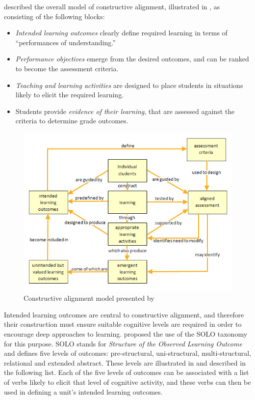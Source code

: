 \citet{Houghton:2004} described the overall model of constructive alignment, illustrated in , as consisting of the following blocks:
\begin{itemize}[noitemsep,nolistsep]
	\item \emph{Intended learning outcomes} clearly define required learning in terms of ``performances of understanding.''
	\item \emph{Performance objectives} emerge from the desired outcomes, and can be ranked to become the assessment criteria.
	\item \emph{Teaching and learning activities} are designed to place students in situations likely to elicit the required learning.
	\item Students provide \emph{evidence of their learning}, that are assessed against the criteria to determine grade outcomes.
\end{itemize}

\begin{figure}[htpb]
	\centering 
	\includegraphics[width=\columnwidth]{Houghton_constructive_alignment_1}
	\caption{Constructive alignment model presented by \citet{Houghton:2004}}
	\label{fig:Houghton}
\end{figure}

Intended learning outcomes are central to constructive alignment, and therefore their construction must ensure suitable cognitive levels are required in order to encourage deep approaches to learning. \citet{Biggs:1996c} proposed the use of the SOLO taxonomy \cite{Biggs:1982} for this purpose. SOLO stands for \emph{Structure of the Observed Learning Outcome} and defines five levels of outcomes: pre-structural, uni-structural, multi-structural, relational and extended abstract. These levels are illustrated in  and described in the following list. Each of the five levels of outcomes can be associated with a list of verbs likely to elicit that level of cognitive activity, and these verbs can then be used in defining a unit's intended learning outcomes.

